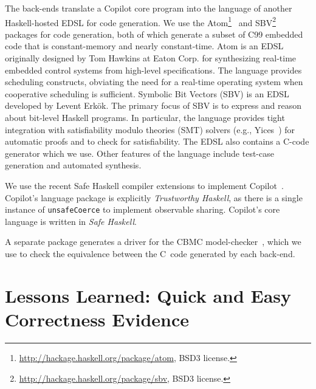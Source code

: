 \documentclass[9pt]{sigplanconf}
\begin{document}



The back-ends translate a Copilot core program into the language of another
Haskell-hosted EDSL for code generation.  We use the
Atom\footnote{\url{http://hackage.haskell.org/package/atom}, BSD3
  license.}~\cite{atom} and
SBV\footnote{\url{http://hackage.haskell.org/package/sbv}, BSD3 license.}
packages for code generation, both of which generate a subset of C99 embedded
code that is constant-memory and nearly constant-time.  Atom is an EDSL
originally designed by Tom Hawkins at Eaton Corp. for synthesizing real-time
embedded control systems from high-level specifications.  The language provides
scheduling constructs, obviating the need for a real-time operating system when
cooperative scheduling is sufficient.  Symbolic Bit Vectors (SBV) is an EDSL
developed by Levent Erk\"{o}k.  The primary focus of SBV is to express and
reason about bit-level Haskell programs.  In particular, the language provides
tight integration with satisfiability modulo theories (SMT) solvers (e.g.,
Yices~\cite{dutertre}) for automatic proofs and to check for satisfiability.
The EDSL also contains a C-code generator which we use.  Other features of the
language include test-case generation and automated synthesis.

We use the recent Safe Haskell compiler extensions to implement
Copilot~\cite{safe}.  Copilot's language package is explicitly \emph{Trustworthy
  Haskell}, as there is a single instance of {\tt unsafeCoerce} to implement
observable sharing.  Copilot's core language is written in \emph{Safe Haskell}.


A separate package generates a driver for the CBMC
model-checker~\cite{cbmc}, which we use to check the equivalence between the C~code
generated by each back-end.

\section{Lessons Learned: Quick and Easy Correctness Evidence}
\label{sec:lessons}
\end{document}
